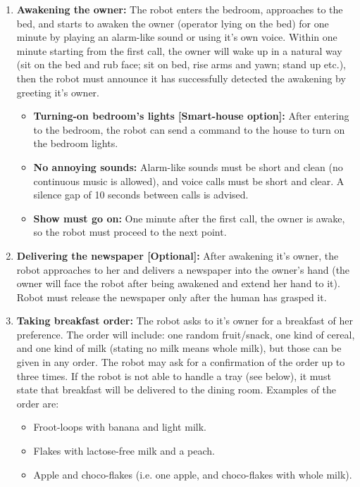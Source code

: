 \begin{enumerate}

\item \textbf{Awakening the owner:} The robot enters the bedroom, approaches to the bed, and starts to awaken the owner (operator lying on the bed) for one minute by playing an alarm-like sound or using it's own voice. Within one minute starting from the first call, the owner will wake up in a natural way (sit on the bed and rub face; sit on bed, rise arms and yawn; stand up etc.), then the robot must announce it has successfully detected the awakening by greeting it's owner.
\begin{itemize}
\item \textbf{Turning-on bedroom's lights [Smart-house option]:} After entering to the bedroom, the robot can send a command to the house to turn on the bedroom lights.
\item \textbf{No annoying sounds:} Alarm-like sounds must be short and clean (no continuous music is allowed), and voice calls must be short and clear. A silence gap of 10 seconds between calls is advised.
\item \textbf{Show must go on:} One minute after the first call, the owner is awake, so the robot must proceed to the next point.
\end{itemize}

\item \textbf{Delivering the newspaper [Optional]:} After awakening it's owner, the robot approaches to her and delivers a newspaper into the owner's hand (the owner will face the robot after being awakened and extend her hand to it). Robot must release the newspaper only after the human has grasped it.

\item \textbf{Taking breakfast order:} The robot asks to it's owner for a breakfast of her preference. The order will include: one random fruit/snack, one kind of cereal, and one kind of milk (stating no milk means whole milk), but those can be given in any order. The robot may ask for a confirmation of the order up to three times. If the robot is not able to handle a tray (see below), it must state that breakfast will be delivered to the dining room. Examples of the order are:

\begin{itemize}
\item Froot-loops with banana and light milk.
\item Flakes with lactose-free milk and a peach.
\item Apple and choco-flakes (i.e. one apple, and choco-flakes with whole milk).
\end{itemize}


\end{enumerate}
